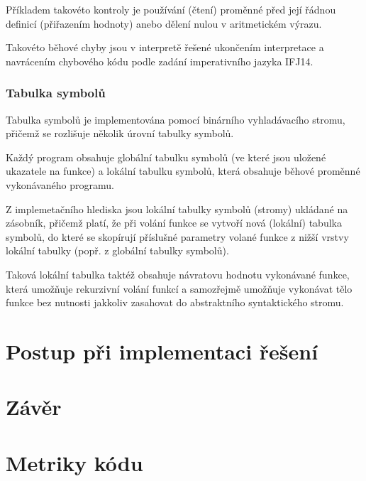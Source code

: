 \documentclass[12pt,a4paper,titlepage,final]{article}
\begin{document}
Příkladem takovéto kontroly je používání (čtení) proměnné před její řádnou
definicí (přiřazením hodnoty) anebo dělení nulou v aritmetickém výrazu.

Takovéto běhové chyby jsou v interpretě řešené ukončením interpretace a navrácením
chybového kódu podle zadání imperativního jazyka IFJ14.

\subsubsection{Tabulka symbolů} \label{tabulka_symbolu}

Tabulka symbolů je implementována pomocí binárního vyhladávacího stromu,
přičemž se rozlišuje několik úrovní tabulky symbolů.

Každý program obsahuje globální tabulku symbolů (ve které jsou uložené ukazatele
na funkce) a lokální tabulku symbolů, která obsahuje běhové proměnné
vykonávaného programu.

Z implemetačního hlediska jsou lokální tabulky symbolů (stromy) ukládané na
zásobník, přičemž platí, že při volání funkce se vytvoří nová (lokální)
tabulka symbolů, do které se skopírují příslušné parametry volané funkce z
nižší vrstvy lokální tabulky (popř. z globální tabulky symbolů).

Taková lokální tabulka taktéž obsahuje návratovu hodnotu vykonávané funkce,
která umožňuje rekurzivní volání funkcí a samozřejmě umožňuje vykonávat tělo
funkce bez nutnosti jakkoliv zasahovat do abstraktního syntaktického stromu.


\section{Postup při implementaci řešení} \label{postup_pri_implementaci_reseni}

\section{Závěr} \label{zaver}

\appendix

\section{Metriky kódu} \label{metriky}
\end{document}
